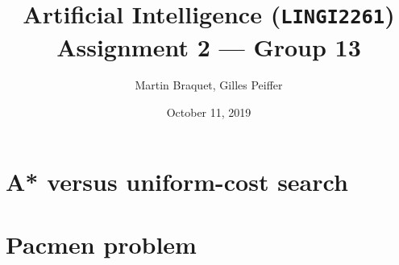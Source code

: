 \documentclass[journal]{IEEEtran}
\title{Artificial Intelligence (\texttt{LINGI2261}) \\ Assignment 2 --- Group 13}
\author{Martin Braquet, Gilles Peiffer}
\date{October 11, 2019}
\begin{document}
\maketitle

\section{A* versus uniform-cost search}

\subsection{}

\subsection{}

\subsection{}


\section{Pacmen problem}

\subsection{}

\subsection{}

\subsection{}

\subsection{}

\subsection{}

\subsection{}

\subsection{}
\end{document}
